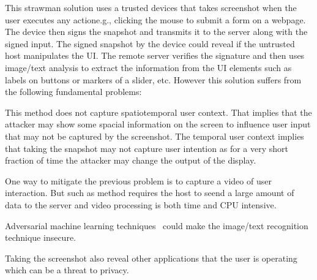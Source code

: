 This strawman solution uses a trusted devices that takes screenshot when the user executes any actione.g., clicking the mouse to submit a form on a webpage. The device then signs the snapshot and transmits it to the server along with the signed input. The signed snapshot by the device could reveal if the untrusted host manipulates the UI. The remote server verifies the signature and then uses image/text analysis to extract the information from the UI elements such as labels on buttons or markers of a slider, etc. However this solution suffers from the following fundamental problems:
\begin{mylist}
  \item This method does not capture spatiotemporal user context. That implies that the attacker may show some spacial information on the screen to influence user input that may not be captured by the screenshot. The temporal user context implies that taking the snapshot may not capture user intention as for a very short fraction of time the attacker may change the output of the display.
  \item One way to mitigate the previous problem is to capture a video of user interaction. But such as method requires the host to seend a large amount of data to the server and video processing is both time and CPU intensive. 
  \item Adversarial machine learning techniques~\cite{eykholt2017robust,sitawarin2018rogue} could make the image/text recognition technique insecure.
  \item Taking the screenshot also reveal other applications that the user is operating which can be a threat to privacy.
\end{mylist}



